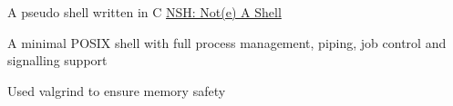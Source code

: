 \begin{cventries}
	\cventry
    {A pseudo shell written in C} %
    {\href{https://github.com/necessary129/nsh}{NSH: Not(e) A Shell}} %
    {} %
    {} %
    {
      \begin{cvitems} %
      	\item {A minimal POSIX shell with full process management, piping, job control and signalling support}
      	\item {Used valgrind to ensure memory safety}
      \end{cvitems}
    }
\end{cventries}
